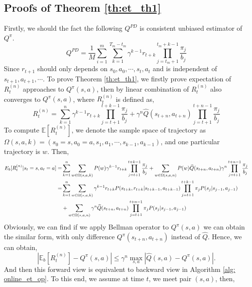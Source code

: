 \documentclass[11pt,a4paper]{article}
\def\hat{\widehat}
\def\E{\mathbb{E}}
\begin{document}
\subsection{Proofs of Theorem \ref{th:et_th1}}
Firstly, we should the fact the following $Q^{PD}$ is consistent unbiased estimator of $Q^{\pi}$.
\begin{equation}
Q^{PD} = \frac{1}{M}\sum_{i=1}^m \sum_{k=1}^{T_m-t_m}\gamma^{k-1}r_{t+k}\prod_{j=t_m+1}^{t_m+k-1}\frac{\pi_j}{b_j}
\end{equation}
Since $r_{t+1}$ should only depends on $s_0,a_0, \cdots, s_t, a_t$ and is independent of $s_{t+1}, a_{t+1}, \cdots$. To prove Theorem \ref{th:et_th1}, we firstly prove expectation of $R_t^{(n)}$ approaches to $Q^{\pi}(s,a)$, then by linear combination of $R_t^{(n)}$ also converges to $Q^{\pi}(s,a)$, where $R_t^{(n)}$ is defined as, 
\begin{equation}
    R_t^{(n)} = \sum_{k=1}^{n}\gamma^{k-1}r_{t+k}\prod_{j=t+1}^{t+k-1}\frac{\pi_j}{b_j} + \gamma^n \hat{Q}(s_{t+n}, a_{t+n})\prod_{j=t+1}^{t+n-1}\frac{\pi_j}{b_j}
\end{equation} 
To compute $\E[R_t^{(n)}]$, we denote the sample space of trajectory as $\Omega(s,a,k) = (s_0=s,a_0=a,s_1,a_1, \cdots,s_{k-1},a_{k-1})$, and one particular trajectory is $w$. Then,
\begin{equation}
    \aligned 
    E_b[R_t^{(n)}|s_t=s,a_t=a] = & \sum_{k=1}^n \sum_{w\in \Omega(s,a,k)} P(w) \gamma^{k-1} r_{t+k} \prod_{j=t+1}^{t+k-1} \frac{\pi_j}{b_j} + \sum_{w\in \Omega(s,a,n)}P(w)\hat{Q}(s_{t+n},a_{t+n})\gamma^n \prod_{j=t+1}^{t+n-1}\frac{\pi_j}{b_j} \\ 
    = & \sum_{k=1}^n\sum_{w\in\Omega(s,a,k)}\gamma^{k-1}r_{t+k}P(s_{t+k},r_{t+k}|s_{t+k-1},a_{t+k-1}) \prod_{j=t+1}^{t+k-1} \pi_j P(s_j|s_{j-1},a_{j-1}) \\ 
    & + \sum_{w\in \Omega(s,a,n)} \gamma^n \hat{Q}(s_{t+n}, a_{t+n}) \prod_{j=t+1}^{t+n-1}\pi_j P(s_j|s_{j-1},a_{j-1})
    \endaligned 
\end{equation}
Obviously, we can find if we apply Bellman operator to $Q^{\pi}(s,a)$ we can obtain the similar form, with only difference $Q^{\pi}(s_{t+n}, a_{t+n})$ instead of $\hat{Q}$. Hence, we can obtain, 
\begin{equation}
    |\E_b[R_t^{(n)}] - Q^{\pi}(s,a)| \le \gamma^n \max_{s,a} |\hat{Q}(s,a) - Q^\pi(s,a)|.
\end{equation}
And then this forward view is equivalent to backward view in Algorithm \ref{alg: online_et_op}. To this end, we assume at time $t$, we meet pair $(s,a)$, then, 
\end{document}
